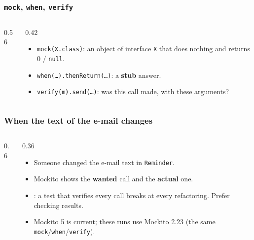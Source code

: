 \documentclass[aspectratio=169,10pt,compress]{beamer}
\begin{document}
\begin{frame}[t,fragile] \frametitle{\texttt{mock}, \texttt{when}, \texttt{verify}}
  \vspace{-0.3cm}
  \begin{columns}[T]
    \begin{column}{0.56\textwidth}
    \end{column}
    \begin{column}{0.42\textwidth}
      \begin{itemize}\small
        \item \texttt{mock(X.class)}: an object of interface \texttt{X} that does nothing and returns 0 / \texttt{null}.
        \item \texttt{when(\dots).thenReturn(\dots)}: a \textbf{stub} answer.
        \item \texttt{verify(m).send(\dots)}: was this call made, with these arguments?
      \end{itemize}
    \end{column}
  \end{columns}
\end{frame}




\begin{frame}[t,fragile] \frametitle{When the text of the e-mail changes}
  \begin{columns}[T]
    \begin{column}{0.6\textwidth}
    \end{column}
    \begin{column}{0.36\textwidth}
      \begin{itemize}\small
        \item Someone changed the e-mail text in \texttt{Reminder}.
        \item Mockito shows the \textbf{wanted} call and the \textbf{actual} one.
        \item {}: a test that verifies every call breaks at every refactoring. Prefer checking results.
        \item Mockito 5 is current; these runs use Mockito 2.23 (the same \texttt{mock}/\texttt{when}/\texttt{verify}).
      \end{itemize}
    \end{column}
  \end{columns}
\end{frame}
\end{document}
